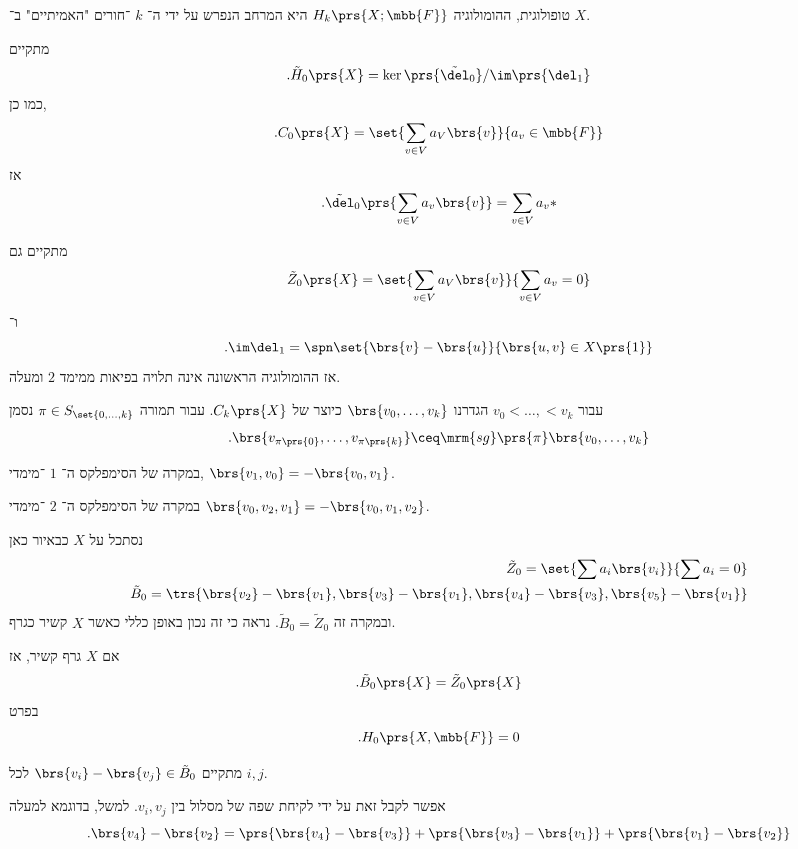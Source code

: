 \documentclass[a4paper,10pt,twoside,openany]{book}
\begin{document}
\begin{remark}
טופולוגית, ההומולוגיה
$H_k\prs{X;\mbb{F}}$
היא המרחב הנפרש על ידי ה־%
$k$%
־חורים "האמיתיים"
ב־%
$X$.
\end{remark}

\begin{example}
מתקיים
\[\text{.} \tilde{H}_0\prs{X} = \ker\prs{\tilde{\del}_0}/\im\prs{\del_1}\]
כמו כן,
\[\text{.} C_0\prs{X} = \set{\sum_{v \in V} a_V \brs{v}}{a_v \in \mbb{F}}\]
אז
\[\text{.} \tilde{\del}_0 \prs{\sum_{v \in V} a_v \brs{v}} = \sum_{v \in V} a_v *\]

מתקיים גם
\[\tilde{Z}_0 \prs{X} = \set{\sum_{v \in V} a_V\brs{v}}{\sum_{v \in V} a_v = 0}\]
ו־%
\[\text{.} \im \del_1 = \spn\set{\brs{v} - \brs{u}}{\brs{u,v} \in X\prs{1}}\]
אז ההומולוגיה הראשונה אינה תלויה בפיאות ממימד
$2$
ומעלה.
\end{example}

\begin{notation}
עבור
$v_0 < \ldots, < v_k$
הגדרנו
$\brs{v_0, \ldots, v_k}$
כיוצר של
$C_k\prs{X}$.
עבור תמורה
$\pi \in S_{\set{0, \ldots, k}}$
נסמן
\[\text{.} \brs{v_{\pi\prs{0}}, \ldots, v_{\pi\prs{k}}} \ceq \mrm{sg}\prs{\pi} \brs{v_0, \ldots, v_k}\]
\end{notation}

\begin{example}
במקרה של הסימפלקס ה־%
$1$%
־מימדי,
$\brs{v_1, v_0} = -\brs{v_0, v_1}$.

במקרה של הסימפלקס ה־%
$2$%
־מימדי
$\brs{v_0, v_2, v_1} = -\brs{v_0, v_1, v_2}$.
\end{example}

\begin{example}
נסתכל על
$X$
כבאיור
כאן
\begin{align*}
\tilde{Z}_0 = \set{\sum a_i \brs{v_i}}{\sum a_i = 0} \\
\tilde{B}_0 = \trs{\brs{v_2} - \brs{v_1}, \brs{v_3} - \brs{v_1}, \brs{v_4} - \brs{v_3}, \brs{v_5} - \brs{v_1}}
\end{align*}
ובמקרה זה
$\tilde{B}_0 = \tilde{Z}_0$.
נראה כי זה נכון באופן כללי כאשר
$X$
קשיר כגרף.
\end{example}

\begin{proposition}
אם
$X$
גרף קשיר, אז
\[\text{.} \tilde{B}_0\prs{X} = \tilde{Z}_0\prs{X}\]
בפרט
\[\text{.} H_0\prs{X, \mbb{F}} = 0\]
\end{proposition}

\begin{remark}
מתקיים
$\brs{v_i} - \brs{v_j} \in \tilde{B}_0$
לכל
$i,j$.


אפשר לקבל זאת על ידי לקיחת שפה של מסלול בין
$v_i, v_j$.
למשל, בדוגמא למעלה
\[\text{.} \brs{v_4} - \brs{v_2} = \prs{\brs{v_4} - \brs{v_3}} + \prs{\brs{v_3} - \brs{v_1}} + \prs{\brs{v_1} - \brs{v_2}}\]
\end{remark}
\end{document}
